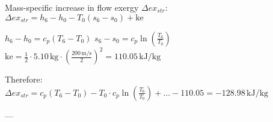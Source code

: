 Mass-specific increase in flow exergy \( \Delta ex_{str} \):  
\( \Delta ex_{str} = h_6 - h_0 - T_0 (s_6 - s_0) + \text{ke} \)  

\( h_6 - h_0 = c_p (T_6 - T_0) \)  
\( s_6 - s_0 = c_p \ln \left( \frac{T_6}{T_0} \right) \)  
\( \text{ke} = \frac{1}{2} \cdot 5.10 \, \text{kg} \cdot \left( \frac{200 \, \text{m/s}}{2} \right)^2 = 110.05 \, \text{kJ/kg} \)  

Therefore:  
\( \Delta ex_{str} = c_p (T_6 - T_0) - T_0 \cdot c_p \ln \left( \frac{T_6}{T_0} \right) + \dots - 110.05 = -128.98 \, \text{kJ/kg} \)  

---